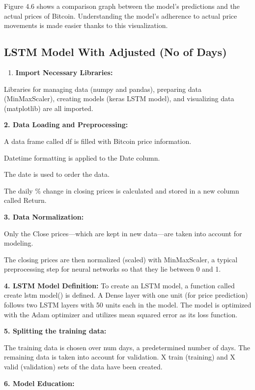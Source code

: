 Figure 4.6 shows a comparison graph between the model's predictions and the actual prices of Bitcoin. Understanding the model's adherence to actual price movements is made easier thanks to this visualization.

\subsection{LSTM Model With Adjusted (No of Days)}

\begin{enumerate}
    \item \textbf{Import Necessary Libraries:}
\end{enumerate}

Libraries for managing data (numpy and pandas), preparing data (MinMaxScaler), creating models (keras LSTM model), and visualizing data (matplotlib) are all imported.

\textbf{2. Data Loading and Preprocessing:}

A data frame called df is filled with Bitcoin price information.

Datetime formatting is applied to the Date column.

The date is used to order the data.

The daily \% change in closing prices is calculated and stored in a new column called Return.

\textbf{3. Data Normalization:}

Only the Close prices—which are kept in new data—are taken into account for modeling.

The closing prices are then normalized (scaled) with MinMaxScaler, a typical preprocessing step for neural networks so that they lie between 0 and 1.

 \textbf{4. LSTM Model Definition:}
To create an LSTM model, a function called create lstm model() is defined. A Dense layer with one unit (for price prediction) follows two LSTM layers with 50 units each in the model.
The model is optimized with the Adam optimizer and utilizes mean squared error as its loss function.

\textbf{5. Splitting the training data:}

The training data is chosen over num days, a predetermined number of days. The remaining data is taken into account for validation.
X train (training) and X valid (validation) sets of the data have been created.

\textbf{6. Model Education:}

